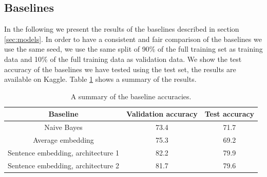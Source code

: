 \documentclass[conference]{IEEEtran}
\begin{document}
	\subsection{Baselines}
	In the following we present the results of the baselines described in section \ref{sec:models}. In order to have a consistent and fair comparison of the baselines we use the same seed, we use the same split of 90\% of the full training set as training data and 10\% of the full training data as validation data. We show the test accuracy of the baselines we have tested using the test set, the results are available on Kaggle. Table \ref{tab:baselines} shows a summary of the results.
\begin{table}[h!]
	\centering
        \caption{A summary of the baseline accuracies.}
        \label{tab:baselines}
		\begin{tabular}{|c|c|c|}
			\hline
			Baseline & Validation accuracy & Test accuracy\\
			\hline
			Naive Bayes & 73.4 & 71.7\\
            Average embedding & 75.3 & 69.2\\
			Sentence embedding, architecture 1 & 82.2 & 79.9\\
			Sentence embedding, architecture 2 & 81.7 & 79.6\\
			\hline
		\end{tabular}
\end{table}
	
\end{document}
